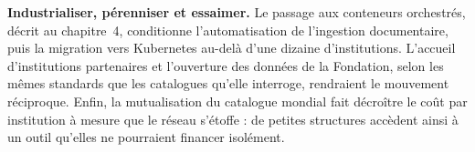 \textbf{Industrialiser, pérenniser et essaimer.} Le passage aux conteneurs
orchestrés, décrit au chapitre~4, conditionne l'automatisation de l'ingestion
documentaire, puis la migration vers Kubernetes au-delà d'une dizaine
d'institutions. L'accueil d'institutions partenaires et l'ouverture des données
de la Fondation, selon les mêmes standards que les catalogues qu'elle interroge,
rendraient le mouvement réciproque. Enfin, la mutualisation du catalogue mondial
fait décroître le coût par institution à mesure que le réseau s'étoffe : de
petites structures accèdent ainsi à un outil qu'elles ne pourraient financer
isolément.
